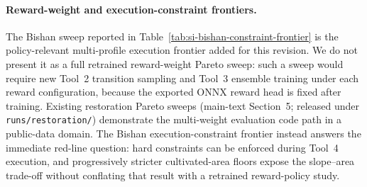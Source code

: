 \documentclass[11pt]{article}
\begin{document}
\paragraph{Reward-weight and execution-constraint frontiers.} The Bishan sweep reported in Table~\ref{tab:si-bishan-constraint-frontier} is the policy-relevant multi-profile execution frontier added for this revision. We do not present it as a full retrained reward-weight Pareto sweep: such a sweep would require new Tool~2 transition sampling and Tool~3 ensemble training under each reward configuration, because the exported ONNX reward head is fixed after training. Existing restoration Pareto sweeps (main-text Section~5; released under \texttt{runs/restoration/}) demonstrate the multi-weight evaluation code path in a public-data domain. The Bishan execution-constraint frontier instead answers the immediate red-line question: hard constraints can be enforced during Tool~4 execution, and progressively stricter cultivated-area floors expose the slope--area trade-off without conflating that result with a retrained reward-policy study.
\end{document}

